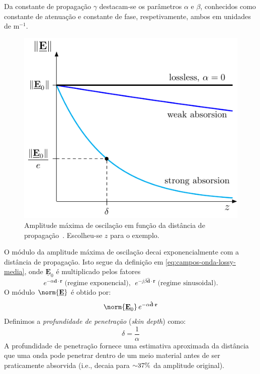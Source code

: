 Da constante de propagação $\gamma$ destacam-se os parâmetros $\alpha$ e $\beta$, conhecidos como constante de atenuação e constante de fase, respetivamente, ambos em unidades de m$^{-1}$.

\vspace{-0.75em}
\begin{minipage}[b]{0.45\linewidth}
    \begin{figure}[H]
        \centering
        \includegraphics[width=\linewidth]{img/1/Skin-depth.pdf}
        \caption{Amplitude máxima de oscilação em função da distância de propagação~\protect\cite{silveirinha2023}. Escolheu-se $z$ para o exemplo.}
    \end{figure}
\end{minipage}\hfill
\begin{minipage}[b]{0.515\linewidth}
    O módulo da amplitude máxima de oscilação decai exponencialmente com a distância de propagação. Isto segue da definição em \eqref{eq:campos-onda-lossy-media}, onde $\mathbf{\underline{E}}_0$ é multiplicado pelos fatores
    \begin{equation*}
        e^{-\alpha \mathbf{\hat{d}} \cdot \mathbf{r}} \;\text{(regime exponencial)},
        \;\,
        e^{-j\beta \mathbf{\hat{d}} \cdot \mathbf{r}}
        \;\text{(regime sinusoidal)}.
    \end{equation*}
    O módulo $\norm{\mathbf{\underline{E}}}$ é obtido por:
    \begin{equation}
        \norm{\mathbf{\underline{E}}_0}\, e^{-\alpha \mathbf{\hat{d}} \cdot \mathbf{r}}
    \end{equation}
    Definimos a \emph{profundidade de penetração} (\emph{skin depth}) como:
    \begin{equation}
        \delta = \frac{1}{\alpha}
    \end{equation}
    A profundidade de penetração fornece uma estimativa aproximada da distância que uma onda pode penetrar dentro de um meio material antes de ser praticamente absorvida (i.e., decaia para ${\scriptsize \sim}37\%$ da amplitude original).
\end{minipage}


